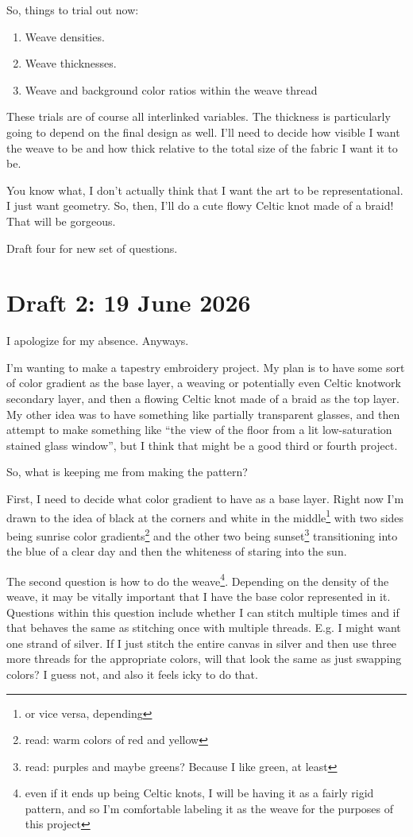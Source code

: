 \documentclass[12pt]{article}
\newcommand{\say}[1]{``#1''}
\renewcommand{\,}{\textsuperscript{,}}
\begin{document}
So, things to trial out now:

\begin{enumerate}

\item Weave densities.  
\item Weave thicknesses.  
\item Weave and background color ratios within the weave thread

\end{enumerate}

These trials are of course all interlinked variables. The thickness is particularly going to depend on the final design as well.  
I'll need to decide how visible I want the weave to be and how thick relative to the total size of the fabric I want it to be.

You know what, I don't actually think that I want the art to be representational.  
I just want geometry.  
So, then, I'll do a cute flowy Celtic knot made of a braid! That will be gorgeous.

Draft four for new set of questions.

\section{Draft 2: 19 June 2026}  
I apologize for my absence.  
Anyways.

I'm wanting to make a tapestry embroidery project.  
My plan is to have some sort of color gradient as the base layer, a weaving or potentially even Celtic knotwork secondary layer, and then a flowing Celtic knot made of a braid as the top layer.  
My other idea was to have something like partially transparent glasses, and then attempt to make something like \say{the view of the floor from a lit low-saturation stained glass window}, but I think that might be a good third or fourth project.

So, what is keeping me from making the pattern?

First, I need to decide what color gradient to have as a base layer.  
Right now I'm drawn to the idea of black at the corners and white in the middle\footnote{or vice versa, depending} with two sides being sunrise color gradients\footnote{read: warm colors of red and yellow} and the other two being sunset\footnote{read: purples and maybe greens? Because I like green, at least} transitioning into the blue of a clear day and then the whiteness of staring into the sun.

The second question is how to do the weave\footnote{even if it ends up being Celtic knots, I will be having it as a fairly rigid pattern, and so I'm comfortable labeling it as the weave for the purposes of this project}.  
Depending on the density of the weave, it may be vitally important that I have the base color represented in it.  
Questions within this question include whether I can stitch multiple times and if that behaves the same as stitching once with multiple threads.  
E.g. I might want one strand of silver. If I just stitch the entire canvas in silver and then use three more threads for the appropriate colors, will that look the same as just swapping colors? I guess not, and also it feels icky to do that.
\end{document}
